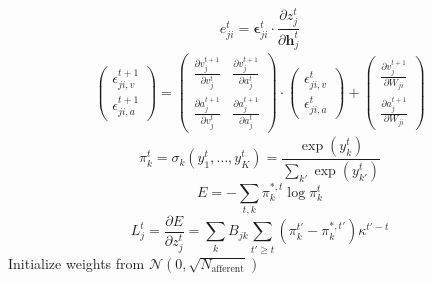 \documentclass[t]{beamer}
\begin{document}
\begin{frame}
\begin{equation}
            e^t_{ji} = \bm{\epsilon}_{ji}^t \cdot \frac{\partial z^t_j}{\partial\mathbf{h}^t_j}
            \end{equation}
            \begin{align}
            \begin{pmatrix}
            \epsilon_{ji, v}^{t+1}\\
            \epsilon_{ji, a}^{t+1}
            \end{pmatrix}
            =
            \begin{pmatrix}
            \frac{\partial v^{t+1}_j}{\partial v^t_j} & \frac{\partial v^{t+1}_j}{\partial a^t_j}\\
            \frac{\partial a^{t+1}_j}{\partial v^t_j} & \frac{\partial a^{t+1}_j}{\partial a^t_j}
            \end{pmatrix}
            \cdot
            \begin{pmatrix}
            \epsilon_{ji, v}^t\\
            \epsilon_{ji, a}^t
            \end{pmatrix}
            +
            \begin{pmatrix}
            \frac{\partial v^{t+1}_j}{\partial W_{ji}}\\
            \frac{\partial a^{t+1}_j}{\partial W_{ji}}
            \end{pmatrix}
            \end{align}
            \begin{equation}
            \pi^t_k = \sigma_k\left(y^t_1,\ldots,y^t_K\right) = \frac{\exp\left(y^t_k\right)}{\sum_{k'}\exp\left(y^t_{k'}\right)}
            \end{equation}
            \begin{equation}
            E = -\sum_{t,k}\pi^{*,t}_k\log\pi^t_k
            \end{equation}
            \begin{equation}\label{eq:learningsignal_after_output}
            L^t_j = \frac{\partial E}{\partial z^t_j} = \sum_kB_{jk}\sum_{t'\geq t}\left(\pi^{t'}_k - \pi^{*,t'}_k\right)\kappa^{t'-t}
            \end{equation}
            Initialize weights from $\mathcal{N}\left(0, \sqrt{N_\text{afferent}}\right)$
\end{frame}
\end{document}
